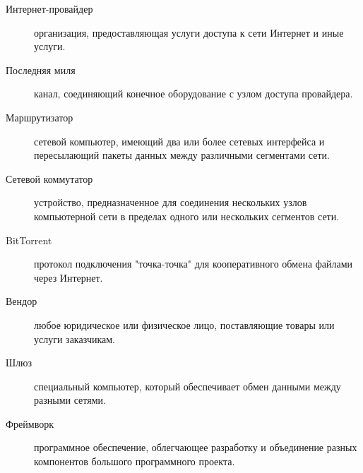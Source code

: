 \Defines
\begin{description}
\item[Интернет-провайдер] организация, предоставляющая услуги доступа к сети Интернет и иные услуги.
\item[Последняя миля] канал, соединяющий конечное оборудование с узлом доступа провайдера.
\item[Маршрутизатор] сетевой компьютер, имеющий два или более сетевых интерфейса и пересылающий пакеты данных между различными сегментами сети.
\item[Сетевой коммутатор] устройство, предназначенное для соединения нескольких узлов компьютерной сети в пределах одного или нескольких сегментов сети.
\item[BitTorrent] протокол подключения "точка-точка" для кооперативного обмена файлами через Интернет.
\item[Вендор] любое юридическое или физическое лицо, поставляющие товары или услуги заказчикам.
\item[Шлюз] специальный компьютер, который обеспечивает обмен данными между разными сетями.
\item[Фреймворк] программное обеспечение, облегчающее разработку и объединение разных компонентов большого программного проекта.
\end{description}
